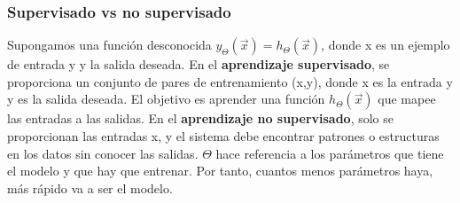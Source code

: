 \subsubsection{Supervisado vs no supervisado}
Supongamos una función desconocida $y_{\Theta}(\vec{x}) = h_{\Theta}(\vec{x})$, donde x es un ejemplo de entrada y y la salida deseada. En el \textbf{aprendizaje supervisado}, se proporciona un conjunto de pares de entrenamiento (x,y), donde x es la entrada y y es la salida deseada. El objetivo es aprender una función $h_{\Theta}(\vec{x})$ que mapee las entradas a las salidas. En el \textbf{aprendizaje no supervisado}, solo se proporcionan las entradas x, y el sistema debe encontrar patrones o estructuras en los datos sin conocer las salidas. $\Theta$ hace referencia a los parámetros que tiene el modelo y que hay que entrenar. Por tanto, cuantos menos parámetros haya, más rápido va a ser el modelo.

